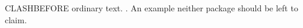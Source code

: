 \documentclass[11pt]{article}
\begin{document}
CLASHBEFORE ordinary text.
\ex. An example neither package should be left to claim.
\end{document}
